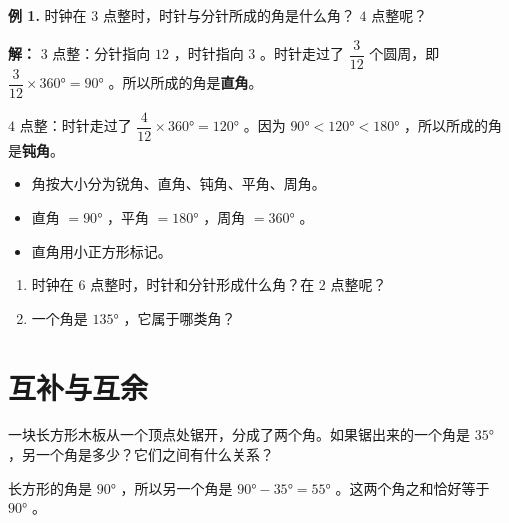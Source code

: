 \begin{workedexamples}


\textbf{例 1.} 时钟在 $3$ 点整时，时针与分针所成的角是什么角？ $4$ 点整呢？

\textbf{解：}
$3$ 点整：分针指向 $12$ ，时针指向 $3$ 。时针走过了 $\dfrac{3}{12}$ 个圆周，即 $\dfrac{3}{12} \times 360° = 90°$ 。所以所成的角是\textbf{直角}。

$4$ 点整：时针走过了 $\dfrac{4}{12} \times 360° = 120°$ 。因为 $90° < 120° < 180°$ ，所以所成的角是\textbf{钝角}。

\end{workedexamples}

\begin{keytakeaway}


\begin{itemize}
  \item 角按大小分为锐角、直角、钝角、平角、周角。
  \item 直角 $= 90°$ ，平角 $= 180°$ ，周角 $= 360°$ 。
  \item 直角用小正方形标记。
\end{itemize}


\end{keytakeaway}

\begin{practice}


\begin{enumerate}
  \item 时钟在 $6$ 点整时，时针和分针形成什么角？在 $2$ 点整呢？
  \item 一个角是 $135°$ ，它属于哪类角？
\end{enumerate}


\end{practice}



\section*{互补与互余}


\begin{explore}


一块长方形木板从一个顶点处锯开，分成了两个角。如果锯出来的一个角是 $35°$ ，另一个角是多少？它们之间有什么关系？

长方形的角是 $90°$ ，所以另一个角是 $90° - 35° = 55°$ 。这两个角之和恰好等于 $90°$ 。

\end{explore}

